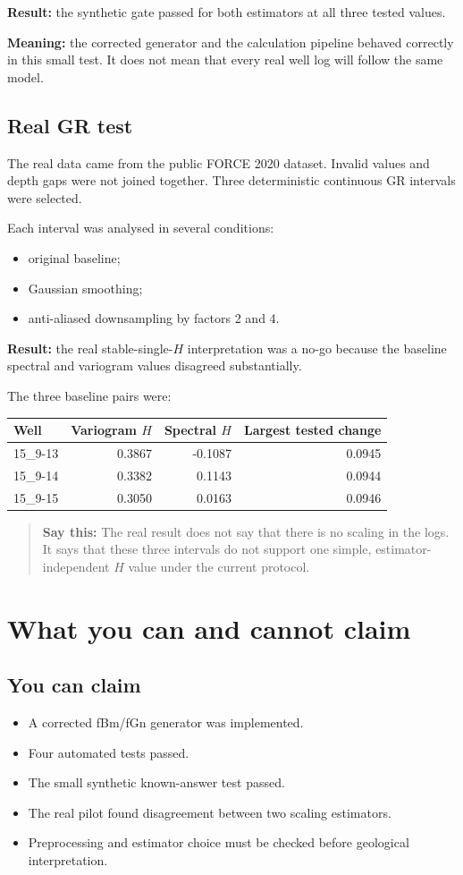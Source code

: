 \documentclass[11pt,a4paper]{article}
\newcommand{\term}[1]{\textbf{\color{Navy}#1}}
\newcommand{\say}[1]{\begin{quote}\color{Navy}\textbf{Say this:} #1\end{quote}}
\begin{document}
\textbf{Result:} the synthetic gate passed for both estimators at all three tested values.

\term{Meaning:} the corrected generator and the calculation pipeline behaved correctly in this small test. It does not mean that every real well log will follow the same model.

\subsection{Real GR test}
The real data came from the public FORCE 2020 dataset. Invalid values and depth gaps were not joined together. Three deterministic continuous GR intervals were selected.

Each interval was analysed in several conditions:
\begin{itemize}
\item original baseline;
\item Gaussian smoothing;
\item anti-aliased downsampling by factors 2 and 4.
\end{itemize}

\textbf{Result:} the real stable-single-$H$ interpretation was a no-go because the baseline spectral and variogram values disagreed substantially.

The three baseline pairs were:
\begin{center}
\begin{tabular}{@{}lrrr@{}}
\toprule
Well & Variogram $H$ & Spectral $H$ & Largest tested change\\
\midrule
15\_9-13 & 0.3867 & -0.1087 & 0.0945\\
15\_9-14 & 0.3382 & 0.1143 & 0.0944\\
15\_9-15 & 0.3050 & 0.0163 & 0.0946\\
\bottomrule
\end{tabular}
\end{center}

\say{The real result does not say that there is no scaling in the logs. It says that these three intervals do not support one simple, estimator-independent $H$ value under the current protocol.}

\section{What you can and cannot claim}
\subsection{You can claim}
\begin{itemize}
\item A corrected fBm/fGn generator was implemented.
\item Four automated tests passed.
\item The small synthetic known-answer test passed.
\item The real pilot found disagreement between two scaling estimators.
\item Preprocessing and estimator choice must be checked before geological interpretation.
\end{itemize}
\end{document}
